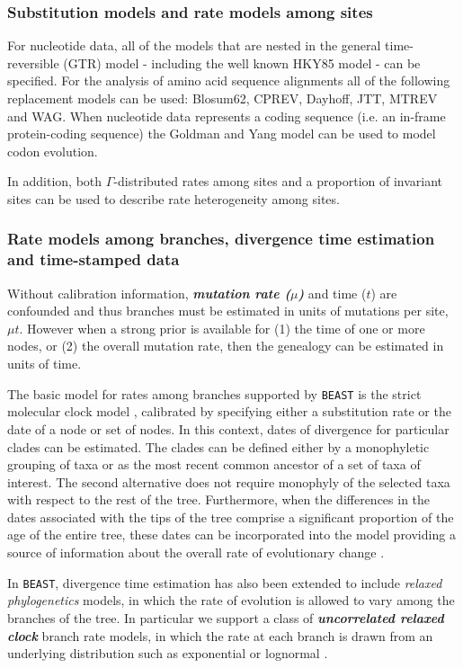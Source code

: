 \documentclass[cup7b, english]{cupbook}
\begin{document}
\subsubsection{Substitution models and rate models among sites}

For nucleotide data, all of the models that are nested in the general
time-reversible (GTR) model \cite{ROMM1990} - including the well
known HKY85 model \cite{HKY1985} - can be specified. For the analysis
of amino acid sequence alignments all of the following replacement
models can be used: Blosum62, CPREV, Dayhoff, JTT, MTREV and WAG.
When nucleotide data represents a coding sequence (i.e. an in-frame
protein-coding sequence) the Goldman and Yang model \cite{GY1994} can be used to model
codon evolution.

In addition, both $\Gamma$-distributed rates among sites \cite{Y1994}
and a proportion of invariant sites can be used to describe rate heterogeneity
among sites.

\subsubsection{Rate models among branches, divergence time estimation and time-stamped
data}

Without calibration information, \textbf{\textit{mutation rate ($\mu$)}}
and time ($t$) are confounded and thus branches must be estimated in units
of mutations per site, $\mu t$. However when a strong prior is available for (1) the time
of one or more nodes, or (2) the overall mutation rate, then the genealogy can be estimated
in units of time.

The basic model for rates among branches supported by \texttt{BEAST} is the
strict molecular clock model \cite{ZP1965}, calibrated by specifying
either a substitution rate or the date of a node or set of nodes.
In this context, dates of divergence for particular clades can be
estimated. The clades can be defined either by a monophyletic grouping
of taxa or as the most recent common ancestor of a set of taxa of
interest. The second alternative does not require monophyly of the
selected taxa with respect to the rest of the tree. Furthermore, when
the differences in the dates associated with the tips of the tree
comprise a significant proportion of the age of the entire tree, these
dates can be incorporated into the model providing a source of information
about the overall rate of evolutionary change \cite{DNRS2002,DPRFR2003}.

In \texttt{BEAST}, divergence time estimation has also been extended to include
\emph{relaxed phylogenetics} models, in which the rate of evolution
is allowed to vary among the branches of the tree. In particular we
support a class of \textbf{\textit{uncorrelated relaxed clock}} branch rate models,
in which the rate at each branch is drawn from an underlying distribution
such as exponential or lognormal \cite{DHPR2006}.
\end{document}
